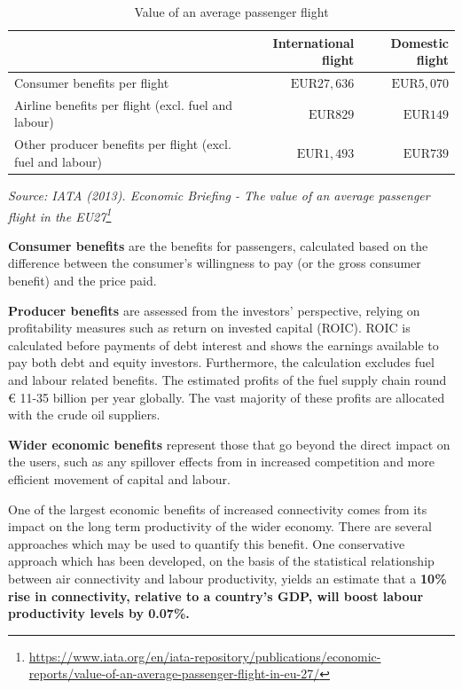 \documentclass[
  11pt,
  a4paper,
]{book}
\DeclareRobustCommand{\href}[2]{#2\footnote{\url{#1}}}
\begin{document}
\hypertarget{tbl-value-of-passenger-flight}{}
\setlength{\LTpost}{0mm}
\begin{longtable}{lrr}
\caption{\label{tbl-value-of-passenger-flight}Value of an average passenger flight }\tabularnewline

\toprule
  & International flight & Domestic flight \\ 
\midrule
Consumer benefits per flight & $\text{EUR}27,636$ & $\text{EUR}5,070$ \\ 
Airline benefits per flight (excl. fuel and labour) & $\text{EUR}829$ & $\text{EUR}149$ \\ 
Other producer benefits per flight (excl. fuel and labour) & $\text{EUR}1,493$ & $\text{EUR}739$ \\ 
\bottomrule
\end{longtable}
\begin{minipage}{\linewidth}
\emph{Source: \href{https://www.iata.org/en/iata-repository/publications/economic-reports/value-of-an-average-passenger-flight-in-eu-27/}{IATA (2013). Economic Briefing - The value of an average passenger flight in the EU27}}\\
\end{minipage}

\textbf{Consumer benefits} are the benefits for passengers, calculated
based on the difference between the consumer's willingness to pay (or
the gross consumer benefit) and the price paid.

\textbf{Producer benefits} are assessed from the investors' perspective,
relying on profitability measures such as return on invested capital
(ROIC). ROIC is calculated before payments of debt interest and shows
the earnings available to pay both debt and equity investors.
Furthermore, the calculation excludes fuel and labour related benefits.
The estimated profits of the fuel supply chain round € 11-35 billion per
year globally. The vast majority of these profits are allocated with the
crude oil suppliers.

\textbf{Wider economic benefits} represent those that go beyond the
direct impact on the users, such as any spillover effects from in
increased competition and more efficient movement of capital and labour.

One of the largest economic benefits of increased connectivity comes
from its impact on the long term productivity of the wider economy.
There are several approaches which may be used to quantify this benefit.
One conservative approach which has been developed, on the basis of the
statistical relationship between air connectivity and labour
productivity, yields an estimate that a \textbf{10\% rise in
connectivity, relative to a country's GDP, will boost labour
productivity levels by 0.07\%.}
\end{document}
